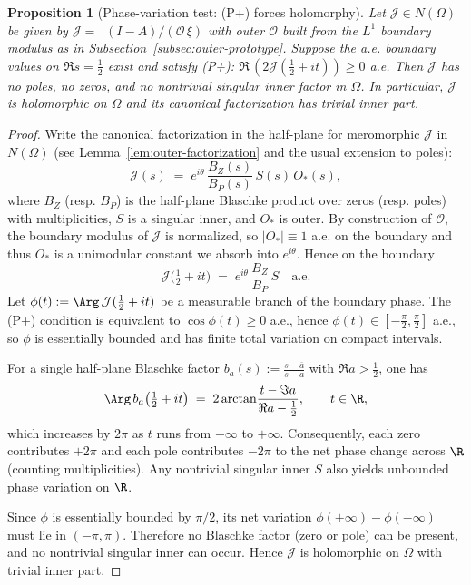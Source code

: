 \documentclass[11pt]{article}
\newtheorem{proposition}[theorem]{Proposition}
\theoremstyle{remark}
\DeclareMathOperator{\dettwo}{det_2}
\begin{document}
\begin{proposition}[Phase-variation test: (P+) forces holomorphy]\label{prop:Pplus-holomorphy}
Let \(\mathcal J\in N(\Omega)\) be given by \(\mathcal J=\dettwo(I-A)/(\mathcal O\,\xi)\) with outer \(\mathcal O\) built from the \(L^1\) boundary modulus as in Subsection~\ref{subsec:outer-prototype}. Suppose the a.e. boundary values on \(\Re s=\tfrac12\) exist and satisfy \emph{(P+)}: \(\Re\,(2\mathcal J(\tfrac12+it))\ge 0\) a.e. Then \(\mathcal J\) has no poles, no zeros, and no nontrivial singular inner factor in \(\Omega\). In particular, \(\mathcal J\) is holomorphic on \(\Omega\) and its canonical factorization has trivial inner part.
\end{proposition}
\begin{proof}
Write the canonical factorization in the half-plane for meromorphic \(\mathcal J\) in \(N(\Omega)\) (see Lemma~\ref{lem:outer-factorization} and the usual extension to poles):
\[
  \mathcal J(s)\;=\;e^{i\theta}\,\frac{B_Z(s)}{B_P(s)}\,S(s)\,O_*(s),
\]
where \(B_Z\) (resp. \(B_P\)) is the half-plane Blaschke product over zeros (resp. poles) with multiplicities, \(S\) is a singular inner, and \(O_*\) is outer. By construction of \(\mathcal O\), the boundary modulus of \(\mathcal J\) is normalized, so \(|O_*|\equiv 1\) a.e. on the boundary and thus \(O_*\) is a unimodular constant we absorb into \(e^{i\theta}\). Hence on the boundary
\[
  \mathcal J\big(\tfrac12+it\big)\;=\;e^{i\theta}\,\frac{B_Z}{B_P}\,S\quad\text{a.e.}
\]
Let \(\phi(t):=\Arg\,\mathcal J(\tfrac12+it)\) be a measurable branch of the boundary phase. The (P+) condition is equivalent to \(\cos\phi(t)\ge 0\) a.e., hence \(\phi(t)\in[-\tfrac{\pi}{2},\tfrac{\pi}{2}]\) a.e., so \(\phi\) is essentially bounded and has finite total variation on compact intervals.

For a single half-plane Blaschke factor \(b_a(s):=\frac{s-\overline a}{s-a}\) with \(\Re a>\tfrac12\), one has
\[
  \Arg\,b_a\big(\tfrac12+it\big)\;=\;2\arctan\!\frac{t-\Im a}{\Re a-\tfrac12},\qquad t\in\R,
\]
which increases by \(2\pi\) as \(t\) runs from \(-\infty\) to \(+\infty\). Consequently, each zero contributes \(+2\pi\) and each pole contributes \(-2\pi\) to the net phase change across \(\R\) (counting multiplicities). Any nontrivial singular inner \(S\) also yields unbounded phase variation on \(\R\).

Since \(\phi\) is essentially bounded by \(\pi/2\), its net variation \(\phi(+\infty)-\phi(-\infty)\) must lie in \((-\pi,\pi)\). Therefore no Blaschke factor (zero or pole) can be present, and no nontrivial singular inner can occur. Hence \(\mathcal J\) is holomorphic on \(\Omega\) with trivial inner part.
\end{proof}
\end{document}
